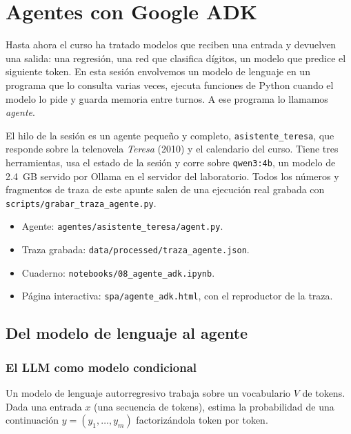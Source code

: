 \documentclass[11pt,letterpaper,oneside]{report}
\begin{document}
\portada
\tableofcontents
\setcounter{chapter}{7}
\chapter{Agentes con Google ADK}

Hasta ahora el curso ha tratado modelos que reciben una entrada y devuelven una salida: una regresión, una red que clasifica dígitos, un modelo que predice el siguiente token. En esta sesión envolvemos un modelo de lenguaje en un programa que lo consulta varias veces, ejecuta funciones de Python cuando el modelo lo pide y guarda memoria entre turnos. A ese programa lo llamamos \emph{agente}.

El hilo de la sesión es un agente pequeño y completo, \texttt{asistente\_teresa}, que responde sobre la telenovela \emph{Teresa} (2010) y el calendario del curso. Tiene tres herramientas, usa el estado de la sesión y corre sobre \texttt{qwen3:4b}, un modelo de 2.4~GB servido por Ollama en el servidor del laboratorio. Todos los números y fragmentos de traza de este apunte salen de una ejecución real grabada con \texttt{scripts/grabar\_traza\_agente.py}.

\begin{nota}
\begin{itemize}
  \item Agente: \texttt{agentes/asistente\_teresa/agent.py}.
  \item Traza grabada: \texttt{data/processed/traza\_agente.json}.
  \item Cuaderno: \texttt{notebooks/08\_agente\_adk.ipynb}.
  \item Página interactiva: \texttt{spa/agente\_adk.html}, con el reproductor de la traza.
\end{itemize}
\end{nota}

\section{Del modelo de lenguaje al agente}

\subsection{El LLM como modelo condicional}

Un modelo de lenguaje autorregresivo trabaja sobre un vocabulario $V$ de tokens. Dada una entrada $x$ (una secuencia de tokens), estima la probabilidad de una continuación $y=(y_1,\dots,y_m)$ factorizándola token por token.
\end{document}
